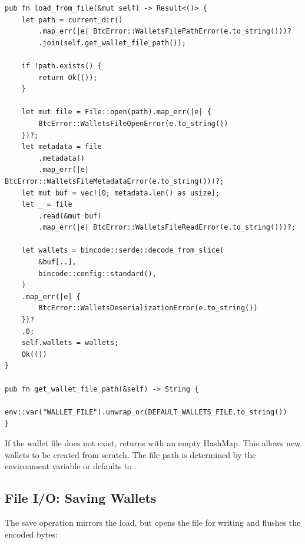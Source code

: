 \begin{listing}[htbp]
\caption{Loading wallets from disk ()}
\label{lst:ch14-load-wallets}
\begin{verbatim}
pub fn load_from_file(&mut self) -> Result<()> {
    let path = current_dir()
        .map_err(|e| BtcError::WalletsFilePathError(e.to_string()))?
        .join(self.get_wallet_file_path());

    if !path.exists() {
        return Ok(());
    }

    let mut file = File::open(path).map_err(|e| {
        BtcError::WalletsFileOpenError(e.to_string())
    })?;
    let metadata = file
        .metadata()
        .map_err(|e| BtcError::WalletsFileMetadataError(e.to_string()))?;
    let mut buf = vec![0; metadata.len() as usize];
    let _ = file
        .read(&mut buf)
        .map_err(|e| BtcError::WalletsFileReadError(e.to_string()))?;

    let wallets = bincode::serde::decode_from_slice(
        &buf[..],
        bincode::config::standard(),
    )
    .map_err(|e| {
        BtcError::WalletsDeserializationError(e.to_string())
    })?
    .0;
    self.wallets = wallets;
    Ok(())
}

pub fn get_wallet_file_path(&self) -> String {
    env::var("WALLET_FILE").unwrap_or(DEFAULT_WALLETS_FILE.to_string())
}
\end{verbatim}
\end{listing}

\begin{checkpointbox}
If the wallet file does not exist,  returns  with an empty HashMap. This allows new wallets to be created from scratch. The file path is determined by the  environment variable or defaults to .
\end{checkpointbox}

\subsection{File I/O: Saving Wallets}
\label{sec:wallet-save}

The save operation mirrors the load, but opens the file for writing and flushes the encoded bytes:

